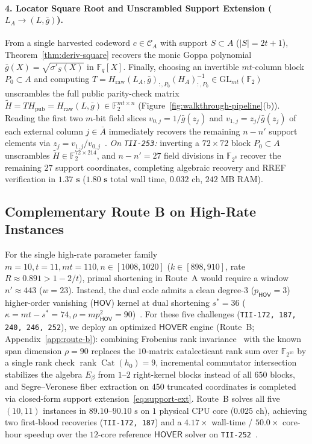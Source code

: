 \documentclass[11pt,a4paper]{article}
\theoremstyle{definition}
\theoremstyle{remark}
\newcommand{\F}{\mathbb{F}}
\newcommand{\rk}{\operatorname{rank}}
\newcommand{\Cat}{\operatorname{Cat}}
\newcommand{\HOV}{\mathsf{HOV}}
\newcommand{\HOVER}{\mathsf{HOVER}}
\begin{document}
\paragraph{4. Locator Square Root and Unscrambled Support Extension ($L_A \to (L, \bar{g})$).}
From a single harvested codeword $c \in \mathcal{C}_A$ with support $S \subset A$ ($|S| = 2t + 1$), Theorem~\ref{thm:deriv-square} recovers the monic Goppa polynomial $\bar{g}(X) = \sqrt{\sigma'_S(X)}$ in $\F_q[X]$. Finally, choosing an invertible $mt$-column block $P_0 \subset A$ and computing $T = H_{\text{raw}}(L_A, \bar{g})_{:, P_0} (H_A)_{:, P_0}^{-1} \in \mathrm{GL}_{mt}(\F_2)$ unscrambles the full public parity-check matrix $\widetilde{H} = T H_{\text{pub}} = H_{\text{raw}}(L, \bar{g}) \in \F_2^{mt \times n}$ (Figure~\ref{fig:walkthrough-pipeline}(b)). Reading the first two $m$-bit field slices $v_{0, j} = 1/\bar{g}(z_j)$ and $v_{1, j} = z_j/\bar{g}(z_j)$ of each external column $j \in \bar{A}$ immediately recovers the remaining $n - n'$ support elements via $z_j = v_{1, j} / v_{0, j}$~\cite{KM23}.
\emph{On \texttt{TII-253}:} inverting a $72 \times 72$ block $P_0 \subset A$ unscrambles $\widetilde{H} \in \F_2^{72 \times 214}$, and $n - n' = 27$ field divisions in $\F_{2^8}$ recover the remaining $27$ support coordinates, completing algebraic recovery and RREF verification in $\mathbf{1.37\text{ s}}$ ($\mathbf{1.80\text{ s}}$ total wall time, $0.032\text{ ch}$, $242\text{ MB}$ RAM).

\subsection{Complementary Route B on High-Rate Instances}
\label{subsec:route-b-summary}

For the single high-rate parameter family $m = 10, t = 11, mt = 110, n \in [1008, 1020]$ ($k \in [898, 910]$, rate $R \approx 0.891 > 1 - 2/t$), primal shortening in Route~A would require a window $n' \approx 443$ ($w = 23$). Instead, the dual code admits a clean degree-$3$ ($p_{\HOV} = 3$) higher-order vanishing ($\HOV$) kernel at dual shortening $s^* = 36$ ($\kappa = mt - s^* = 74, \rho = m p_{\HOV}^2 = 90$)~\cite{HW26,Hem26,Saa26a}. For these five challenges (\texttt{TII-172, 187, 240, 246, 252}), we deploy an optimized $\HOVER$ engine (Route~B; Appendix~\ref{app:route-b}): combining Frobenius rank invariance~\cite{Saa26a} with the known span dimension $\rho = 90$ replaces the $10$-matrix catalecticant rank sum over $\F_{2^{10}}$ by a single rank check $\rk\Cat(h_0) = 9$, incremental commutator intersection stabilizes the algebra $E_\beta$ from $1\text{--}2$ right-kernel blocks instead of all $650$ blocks, and Segre--Veronese fiber extraction on $450$ truncated coordinates is completed via closed-form support extension~\eqref{eq:support-ext}. Route~B solves all five $(10, 11)$ instances in $89.10\text{--}90.10\text{ s}$ on $1$ physical CPU core ($0.025\text{ ch}$), achieving two first-blood recoveries (\texttt{TII-172, 187}) and a $4.17\times$ wall-time / $50.0\times$ core-hour speedup over the $12$-core reference $\HOVER$ solver on \texttt{TII-252}~\cite{Saa26a}.
\end{document}
